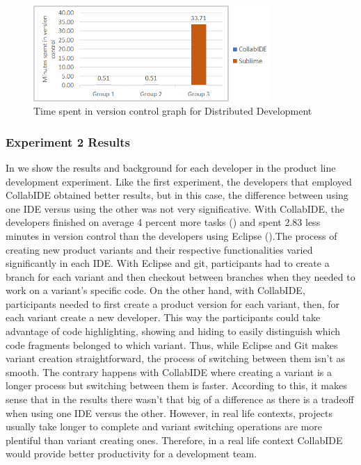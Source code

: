 \begin{figure}[htbp]
  \centering
  \includegraphics[width=0.8\textwidth]{img/versionControlCollaborative}
  \caption{Time spent in version control graph for Distributed Development}
  \label{fig:{img/versionControlCollaborative}}
\end{figure}

\subsubsection{Experiment 2 Results}

In  we show the results and background for each developer in the product line development experiment. Like the first experiment, the developers that employed CollabIDE obtained better results, but in this case, the difference between using one IDE versus using the other was not very significative. With CollabIDE, the developers finished on average 4 percent more tasks () and spent 2.83 less minutes in version control than the developers using Eclipse ().The process of creating new product variants and their respective functionalities varied significantly in each IDE. With Eclipse and git, participants had to create a branch for each variant and then checkout between branches when they needed to work on a variant’s specific code. On the other hand, with CollabIDE, participants needed to first create a product version for each variant, then, for each variant create a new developer. This way the participants could take advantage of code highlighting, showing and hiding to easily distinguish which code fragments belonged to which variant. Thus, while Eclipse and Git makes variant creation straightforward, the process of switching between them isn’t as smooth. The contrary happens with CollabIDE where creating a variant is a longer process but switching between them is faster. According to this, it makes sense that in the results there wasn’t that big of a difference as there is a tradeoff when using one IDE versus the other. However, in real life contexts, projects usually take longer to complete and variant switching operations are more plentiful than variant creating ones. Therefore, in a real life context CollabIDE would provide better productivity for a development team.


